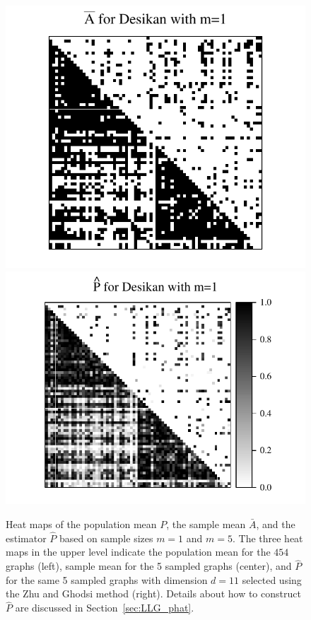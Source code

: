 \begin{figure}
\includegraphics[height=.201\textheight]{./Figures/Abar_desikan_m1.pdf} \hspace{-35pt}
\includegraphics[height=.205\textheight]{./Figures/Phat_desikan_m1.pdf}
\caption[Heat maps of the population mean, the sample mean, and the low-rank estimator]{Heat maps of the population mean $P$, the sample mean $\bar{A}$, and the estimator $\hat{P}$ based on sample sizes $m = 1$ and $m = 5$.
The three heat maps in the upper level indicate the population mean for the $454$ graphs (left), sample mean for the 5 sampled graphs (center), and $\hat{P}$ for the same 5 sampled graphs with dimension $d=11$ selected using the Zhu and Ghodsi method (right). Details about how to construct $\hat{P}$ are discussed in Section~\ref{sec:LLG_phat}.
}
\end{figure}
